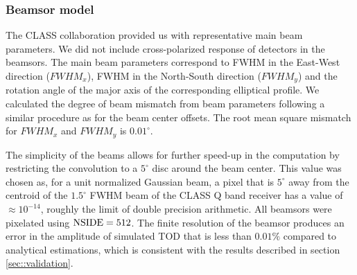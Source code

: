 \documentclass[a4paper,11pt]{article}
\begin{document}
\subsubsection{Beamsor model}


The CLASS collaboration provided us with representative main beam parameters. We did not include cross-polarized response of detectors in the beamsors. The main beam parameters correspond to FWHM in the East-West direction ($FWHM_x$), FWHM in the North-South direction ($FWHM_y$) and the rotation angle of the major axis of the corresponding elliptical profile. We calculated the degree of beam mismatch from beam parameters following a similar procedure as for the beam center offsets. The root mean square mismatch for $FWHM_x$ and $FWHM_y$ is $0.01^{\circ}$.

The simplicity of the beams allows for further speed-up in the computation by restricting the convolution to a $5^\circ$ disc around the beam center. This value was chosen as, for a unit normalized Gaussian beam, a pixel that is $5^\circ$ away from the centroid of the $1.5^{\circ}$ FWHM beam of the CLASS Q band receiver has a value of $\approx 10^{-14}$, roughly the limit of double precision arithmetic. All beamsors were pixelated using $\rm{NSIDE}=512$. The finite resolution of the beamsor produces an error in the amplitude of simulated TOD that is less than $0.01\%$ compared to analytical estimations, which is consistent with the results described in section \ref{sec::validation}.

\end{document}
